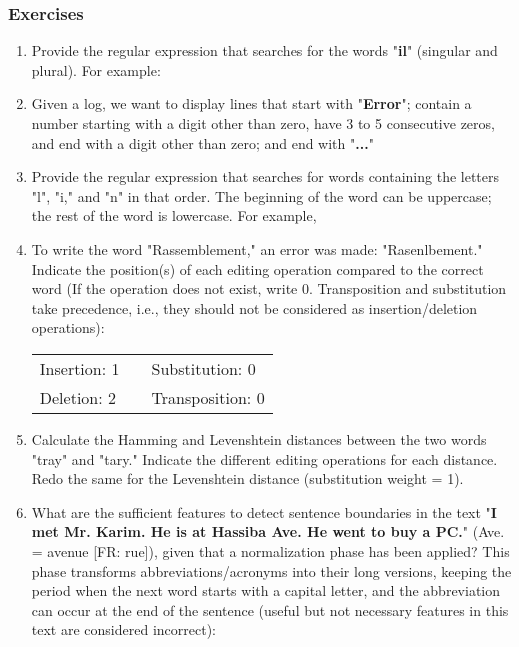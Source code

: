 \documentclass{KBook}
\begin{document}

\subsubsection*{Exercises}

\begin{enumerate}
	\item Provide the regular expression that searches for the words "\textbf{il}" (singular and plural). For example: 
	\item Given a log, we want to display lines that start with "\textbf{Error}"; contain a number starting with a digit other than zero, have 3 to 5 consecutive zeros, and end with a digit other than zero; and end with "\textbf{...}"
	\item Provide the regular expression that searches for words containing the letters "l", "i," and "n" in that order. The beginning of the word can be uppercase; the rest of the word is lowercase. For example, 
	\item To write the word "Rassemblement," an error was made: "Rasenlbement." Indicate the position(s) of each editing operation compared to the correct word (If the operation does not exist, write 0. Transposition and substitution take precedence, i.e., they should not be considered as insertion/deletion operations):
	
	\begin{tabular}{|lll|}
		\hline 
		Insertion: 1 & & Substitution: 0 \\
		Deletion: 2 & & Transposition: 0 \\
		\hline
	\end{tabular}
	
	\item Calculate the Hamming and Levenshtein distances between the two words "tray" and "tary." Indicate the different editing operations for each distance. Redo the same for the Levenshtein distance (substitution weight = 1).
	
	\item What are the sufficient features to detect sentence boundaries in the text "\textbf{I met Mr. Karim. He is at Hassiba Ave. He went to buy a PC.}" (Ave. = avenue [FR: rue]), given that a normalization phase has been applied? This phase transforms abbreviations/acronyms into their long versions, keeping the period when the next word starts with a capital letter, and the abbreviation can occur at the end of the sentence (useful but not necessary features in this text are considered incorrect):
	

\end{enumerate}
\end{document}
